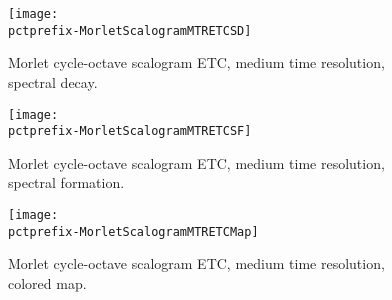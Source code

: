 \documentclass[a4paper,titlepage]{article}
\newcommand{\pctprefix}{T}
\newcommand{\pctwidth}{1.0}
\begin{document}
\begin{figure}
\begin{center}
\texttt{[image: \\pctprefix-MorletScalogramMTRETCSD]}
\caption{Morlet cycle-octave scalogram ETC, medium time resolution, spectral decay.}
\end{center}
\end{figure}

\begin{figure}
\begin{center}
\texttt{[image: \\pctprefix-MorletScalogramMTRETCSF]}
\caption{Morlet cycle-octave scalogram ETC, medium time resolution, spectral formation.}
\end{center}
\end{figure}

\begin{figure}
\begin{center}
\texttt{[image: \\pctprefix-MorletScalogramMTRETCMap]}
\caption{Morlet cycle-octave scalogram ETC, medium time resolution, colored map.}
\end{center}
\end{figure}
\end{document}
